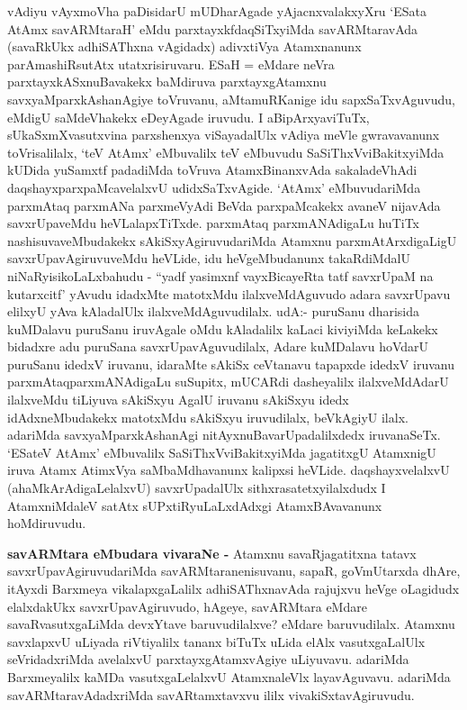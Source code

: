 \begin{artha}
vAdiyu vAyxmoVha paDisidarU mUDharAgade yAjacnxvalakxyXru `ESata AtAmx savARMtaraH' eMdu parxtayxkfdaqSiTxyiMda savARMtaravAda (savaRkUkx adhiSAThxna vAgidadx) adivxtiVya Atamxnanunx parAmashiRsutAtx utatxrisiruvaru. ESaH = eMdare neVra parxtayxkASxnuBavakekx baMdiruva parxtayxgAtamxnu savxyaMparxkAshanAgiye toVruvanu, aMtamuRKanige idu sapxSaTxvAguvudu, eMdigU saMdeVhakekx eDeyAgade iruvudu. I aBipArxyaviTuTx, sUkaSxmXvasutxvina parxshenxya viSayadalUlx vAdiya meVle gwravavanunx toVrisalilalx, `teV AtAmx' eMbuvalilx teV eMbuvudu SaSiThxVviBakitxyiMda kUDida yuSamxtf padadiMda toVruva AtamxBinanxvAda sakaladeVhAdi daqshayxparxpaMcavelalxvU udidxSaTxvAgide. `AtAmx' eMbuvudariMda parxmAtaq parxmANa parxmeVyAdi BeVda parxpaMcakekx avaneV nijavAda savxrUpaveMdu heVLalapxTiTxde. parxmAtaq parxmANAdigaLu huTiTx nashisuvaveMbudakekx sAkiSxyAgiruvudariMda Atamxnu parxmAtArxdigaLigU savxrUpavAgiruvuveMdu heVLide, idu heVgeMbudanunx takaRdiMdalU niNaRyisikoLaLxbahudu - ``yadf yasimxnf vayxBicayeRta tatf savxrUpaM na kutarxcitf' yAvudu idadxMte matotxMdu ilalxveMdAguvudo adara savxrUpavu elilxyU yAva kAladalUlx ilalxveMdAguvudilalx. udA:- puruSanu dharisida kuMDalavu puruSanu iruvAgale oMdu kAladalilx kaLaci kiviyiMda keLakekx bidadxre adu puruSana savxrUpavAguvudilalx, Adare kuMDalavu hoVdarU puruSanu idedxV iruvanu, idaraMte sAkiSx ceVtanavu tapapxde idedxV iruvanu parxmAtaqparxmANAdigaLu suSupitx, mUCARdi dasheyalilx ilalxveMdAdarU ilalxveMdu tiLiyuva sAkiSxyu AgalU iruvanu sAkiSxyu idedx idAdxneMbudakekx matotxMdu sAkiSxyu iruvudilalx, beVkAgiyU ilalx. adariMda savxyaMparxkAshanAgi nitAyxnuBavarUpadalilxdedx iruvanaSeTx. `ESateV AtAmx' eMbuvalilx SaSiThxVviBakitxyiMda jagatitxgU AtamxnigU iruva Atamx AtimxVya saMbaMdhavanunx kalipxsi heVLide. daqshayxvelalxvU (ahaMkArAdigaLelalxvU) savxrUpadalUlx sithxrasatetxyilalxdudx I AtamxniMdaleV satAtx sUPxtiRyuLaLxdAdxgi AtamxBAvavanunx hoMdiruvudu.
\end{artha}

\begin{artha}
{\bf savARMtara eMbudara vivaraNe -} Atamxnu savaRjagatitxna tatavx savxrUpavAgiruvudariMda savARMtaranenisuvanu, sapaR, goVmUtarxda dhAre, itAyxdi Barxmeya vikalapxgaLalilx adhiSAThxnavAda rajujxvu heVge oLagidudx elalxdakUkx savxrUpavAgiruvudo, hAgeye, savARMtara eMdare savaRvasutxgaLiMda devxYtave baruvudilalxve? eMdare baruvudilalx. Atamxnu savxlapxvU uLiyada riVtiyalilx tananx biTuTx uLida elAlx vasutxgaLalUlx seVridadxriMda avelalxvU parxtayxgAtamxvAgiye uLiyuvavu. adariMda Barxmeyalilx kaMDa vasutxgaLelalxvU AtamxnaleVlx layavAguvavu. adariMda savARMtaravAdadxriMda savARtamxtavxvu ililx vivakiSxtavAgiruvudu. 
\end{artha}

